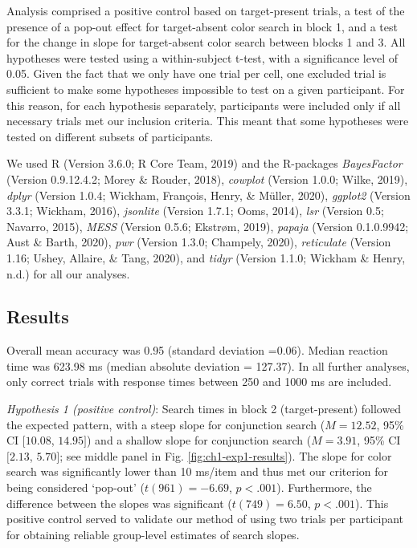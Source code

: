 \documentclass[12pt,twoside]{reedthesis}
\begin{document}
Analysis comprised a positive control based on target-present trials, a test of the presence of a pop-out effect for target-absent color search in block 1, and a test for the change in slope for target-absent color search between blocks 1 and 3. All hypotheses were tested using a within-subject t-test, with a significance level of 0.05.
Given the fact that we only have one trial per cell, one excluded trial is sufficient to make some hypotheses impossible to test on a given participant. For this reason, for each hypothesis separately, participants were included only if all necessary trials met our inclusion criteria. This meant that some hypotheses were tested on different subsets of participants.

We used R (Version 3.6.0; R Core Team, 2019) and the R-packages \emph{BayesFactor} (Version 0.9.12.4.2; Morey \& Rouder, 2018), \emph{cowplot} (Version 1.0.0; Wilke, 2019), \emph{dplyr} (Version 1.0.4; Wickham, François, Henry, \& Müller, 2020), \emph{ggplot2} (Version 3.3.1; Wickham, 2016), \emph{jsonlite} (Version 1.7.1; Ooms, 2014), \emph{lsr} (Version 0.5; Navarro, 2015), \emph{MESS} (Version 0.5.6; Ekstrøm, 2019), \emph{papaja} (Version 0.1.0.9942; Aust \& Barth, 2020), \emph{pwr} (Version 1.3.0; Champely, 2020), \emph{reticulate} (Version 1.16; Ushey, Allaire, \& Tang, 2020), and \emph{tidyr} (Version 1.1.0; Wickham \& Henry, n.d.) for all our analyses.

\hypertarget{results}{%
\subsection{Results}\label{results}}

Overall mean accuracy was 0.95 (standard deviation =0.06). Median reaction time was 623.98 ms (median absolute deviation = 127.37). In all further analyses, only correct trials with response times between 250 and 1000 ms are included.

\emph{Hypothesis 1 (positive control)}: Search times in block 2 (target-present) followed the expected pattern, with a steep slope for conjunction search (\(M = 12.52\), 95\% CI \([10.08\), \(14.95]\)) and a shallow slope for conjunction search (\(M = 3.91\), 95\% CI \([2.13\), \(5.70]\); see middle panel in Fig. \ref{fig:ch1-exp1-results}). The slope for color search was significantly lower than 10 ms/item and thus met our criterion for being considered `pop-out' (\(t(961) = -6.69\), \(p < .001\)). Furthermore, the difference between the slopes was significant (\(t(749) = 6.50\), \(p < .001\)). This positive control served to validate our method of using two trials per participant for obtaining reliable group-level estimates of search slopes.
\end{document}

